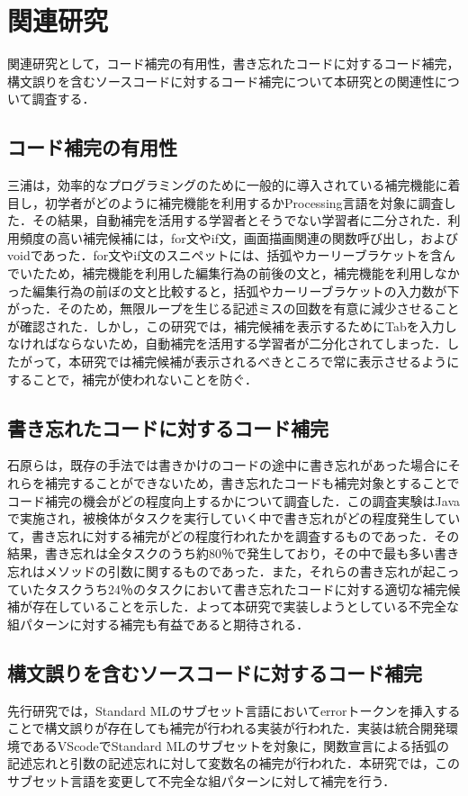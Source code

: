 \documentclass[12pt,a4j]{jreport}
\begin{document}
\chapter{関連研究}

関連研究として，コード補完の有用性，書き忘れたコードに対するコード補完，構文誤りを含むソースコードに対するコード補完について本研究との関連性について調査する．

\section{コード補完の有用性}
三浦\cite{eff}は，効率的なプログラミングのために一般的に導入されている補完機能に着目し，初学者がどのように補完機能を利用するかProcessing言語を対象に調査した．その結果，自動補完を活用する学習者とそうでない学習者に二分された．利用頻度の高い補完候補には，for文やif文，画面描画関連の関数呼び出し，およびvoidであった．for文やif文のスニペットには、括弧やカーリーブラケットを含んでいたため，補完機能を利用した編集行為の前後の文と，補完機能を利用しなかった編集行為の前ぼの文と比較すると，括弧やカーリーブラケットの入力数が下がった．そのため，無限ループを生じる記述ミスの回数を有意に減少させることが確認された．しかし，この研究では，補完候補を表示するためにTabを入力しなければならないため，自動補完を活用する学習者が二分化されてしまった．したがって，本研究では補完候補が表示されるべきところで常に表示させるようにすることで，補完が使われないことを防ぐ．


\section{書き忘れたコードに対するコード補完}
石原らは，既存の手法では書きかけのコードの途中に書き忘れがあった場合にそれらを補完することができないため，書き忘れたコードも補完対象とすることでコード補完の機会がどの程度向上するかについて調査した\cite{hos}．この調査実験はJavaで実施され，被検体がタスクを実行していく中で書き忘れがどの程度発生していて，書き忘れに対する補完がどの程度行われたかを調査するものであった．その結果，書き忘れは全タスクのうち約80％で発生しており，その中で最も多い書き忘れはメソッドの引数に関するものであった．また，それらの書き忘れが起こっていたタスクうち24％のタスクにおいて書き忘れたコードに対する適切な補完候補が存在していることを示した．よって本研究で実装しようとしている不完全な組パターンに対する補完も有益であると期待される．

\section{構文誤りを含むソースコードに対するコード補完}
先行研究\cite{sato}では，Standard MLのサブセット言語においてerrorトークンを挿入することで構文誤りが存在しても補完が行われる実装が行われた．実装は統合開発環境であるVScodeでStandard MLのサブセットを対象に，関数宣言による括弧の記述忘れと引数の記述忘れに対して変数名の補完が行われた．本研究では，このサブセット言語を変更して不完全な組パターンに対して補完を行う．
\end{document}
